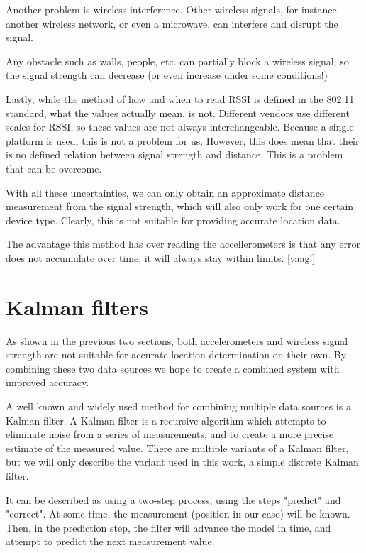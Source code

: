 \documentclass[twoside, 11pt]{uva-bachelor-thesis}
\begin{document}
Another problem is wireless interference. Other wireless signals, for instance another wireless network, or even a microwave, can interfere and disrupt the signal.

Any obstacle such as walls, people, etc. can partially block a wireless signal, so the signal strength can decrease (or even increase under some conditions!)

Lastly, while the method of how and when to read RSSI is defined in the 802.11 standard, what the values actually mean, is not. Different vendors use different scales for RSSI, so these values are not always interchangeable. Because a single platform is used, this is not a problem for us. However, this does mean that their is no defined relation between signal strength and distance. This is a problem that can be overcome.

With all these uncertainties, we can only obtain an approximate distance measurement from the signal strength, which will also only work for one certain device type. Clearly, this is not suitable for providing accurate location data. 

The advantage this method has over reading the accellerometers is that any error does not accumulate over time, it will always stay within limits. [vaag!]


\section{Kalman filters}
As shown in the previous two sections, both accelerometers and wireless signal strength are not suitable for accurate location determination on their own. By combining these two data sources we hope to create a combined system with improved accuracy.

A well known and widely used method for combining multiple data sources is a Kalman filter. A Kalman filter is a recursive algorithm which attempts to eliminate noise from a series of measurements, and to create a more precise estimate of the measured value. There are multiple variants of a Kalman filter, but we will only describe the variant used in this work, a simple discrete Kalman filter.

It can be described as using a two-step process, using the steps "predict" and "correct". At some time, the measurement (position in our case) will be known. Then, in the prediction step, the filter will advance the model in time, and attempt to predict the next measurement value.
\end{document}
